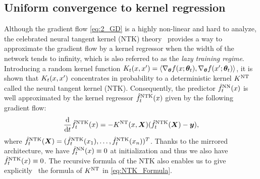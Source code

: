\subsection{Uniform convergence to kernel regression}\label{subsec:UniformConv}

Although the gradient flow \cref{eq:2_GD} is a highly non-linear and hard to analyze,
the celebrated neural tangent kernel (NTK) theory~\citep{jacot2018_NeuralTangent} provides a way to approximate the gradient flow by a kernel regressor
when the width of the network tends to infinity,
which is also referred to as the \textit{lazy training regime}.
Introducing a random kernel function $K_t(x,x') = \left\langle{\nabla_{\bm{\theta}} f(x;\bm{\theta}_t),\nabla_{\bm{\theta}} f(x';\bm{\theta}_t)}\right\rangle$,
it is shown that $K_t(x,x')$ concentrates in probability to a deterministic kernel $K^{\mathrm{NT}}$ called the neural tangent kernel (NTK).
Consequently, the predictor $\hat{f}^{\mathrm{NN}}_t(x)$ is well approximated by the kernel regressor $\hat{f}^{\mathrm{NTK}}_t(x)$ given by the following gradient flow:
\begin{align}
  \label{eq:2_NTK_GF}
  \dv{t} \hat{f}^{\mathrm{NTK}}_t(x) = - K^{\mathrm{NT}}(x,\bm{X}) (\hat{f}^{\mathrm{NTK}}_t(\bm{X}) - \bm{y}),
\end{align}
where $\hat{f}^{\mathrm{NTK}}_t(\bm{X}) = (\hat{f}^{\mathrm{NTK}}_t(x_1),\dots,\hat{f}^{\mathrm{NTK}}_t(x_n))^T$.
Thanks to the mirrored architecture, we have $\hat{f}^{\mathrm{NN}}_t(x) \equiv 0$ at initialization and thus we also have $\hat{f}^{\mathrm{NTK}}_t(x) \equiv 0$.
The recursive formula of the NTK also enables us to give explicitly~\citep{jacot2018_NeuralTangent,bietti2020_DeepEquals}
the formula of $K^{\mathrm{NT}}$ in \cref{eq:NTK_Formula}.


